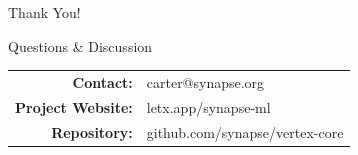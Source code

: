 \begin{frame}[plain]
  \begin{center}
    \Huge\color{SynapseNavy} Thank You!
    
    \vspace{0.8cm}
    
    \large\color{SynapseCharcoal} Questions \& Discussion
    
    \vspace{1.0cm}
    
    \small
    \begin{tabular}{rl}
      \textbf{Contact:} & carter@synapse.org \\
      \textbf{Project Website:} & letx.app/synapse-ml \\
      \textbf{Repository:} & github.com/synapse/vertex-core
    \end{tabular}
  \end{center}
\end{frame}
